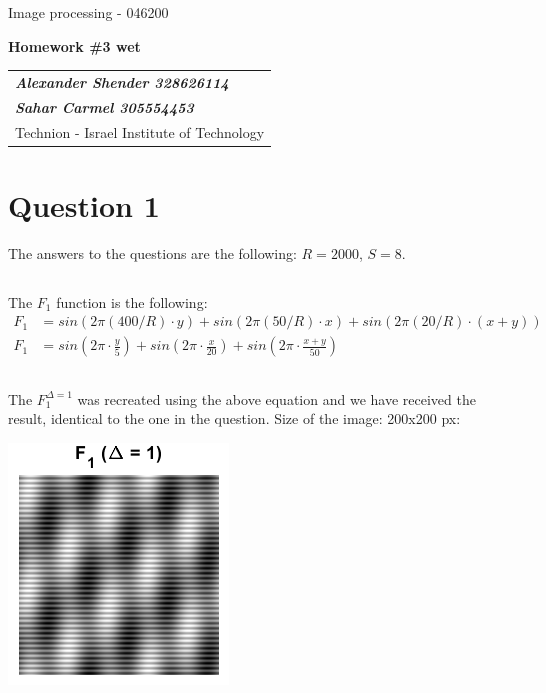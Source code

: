 \documentclass[a4paper]{iacas}
\begin{document}
\begin{center}
 \large Image processing - 046200
 \end{center}
\begin{center}
\large\textbf{Homework \#3 wet}
 \end{center}


\begin{tabular}{l}
\\
{\bf\textit{Alexander Shender 328626114}} \\
{\bf\textit{Sahar Carmel 305554453}} \\
Technion - Israel Institute of Technology
\end{tabular}


\newpage
\section{Question 1}
The answers to the questions are the following: $R=2000$, $S = 8$.
\subsection{}
The $F_{1}$ function is the following:
\begin{align*}
F_{1} &= sin(2\pi(400/R)\cdot y) + sin(2\pi(50/R)\cdot x) + sin(2\pi(20/R)\cdot (x+y)) \\
F_{1} &= sin(2\pi \cdot \frac{y}{5}) + sin(2\pi \cdot \frac{x}{20}) + sin(2\pi \cdot \frac{x+y}{50})
\end{align*}
\subsection{}
The $F_{1}^{\Delta=1}$ was recreated using the above equation and we have received the result, identical to the one in the question. Size of the image: 200x200 px:

\vskip 0.1in
\begin{minipage}{0.5\textwidth}
\centering
	\includegraphics[scale=1]{../imgs/q1_1.png}
\end{minipage}
\vskip 0.1in
\end{document}
